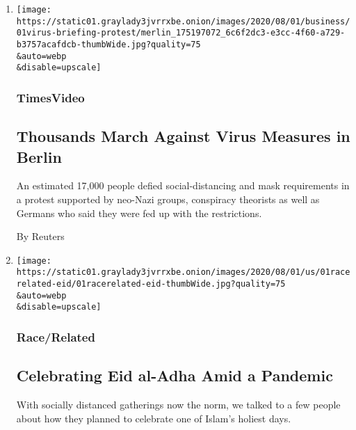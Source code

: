 \begin{enumerate}
\def\labelenumi{\arabic{enumi}.}
\item
  \href{/video/world/europe/100000007268465/coronavirus-protest-germany.html}{}

  \texttt{[image: https://static01.graylady3jvrrxbe.onion/images/2020/08/01/business/01virus-briefing-protest/merlin\_175197072\_6c6f2dc3-e3cc-4f60-a729-b3757acafdcb-thumbWide.jpg?quality=75\\\&auto=webp\\\&disable=upscale]}

  \hypertarget{timesvideo}{%
  \subsubsection{TimesVideo}\label{timesvideo}}

  \hypertarget{thousands-march-against-virus-measures-in-berlin}{%
  \subsection{Thousands March Against Virus Measures in
  Berlin}\label{thousands-march-against-virus-measures-in-berlin}}

  An estimated 17,000 people defied social-distancing and mask
  requirements in a protest supported by neo-Nazi groups, conspiracy
  theorists as well as Germans who said they were fed up with the
  restrictions.

  By Reuters
\item
  \href{/2020/08/01/us/eid-al-adha-coronavirus.html}{}

  \texttt{[image: https://static01.graylady3jvrrxbe.onion/images/2020/08/01/us/01racerelated-eid/01racerelated-eid-thumbWide.jpg?quality=75\\\&auto=webp\\\&disable=upscale]}

  \hypertarget{racerelated}{%
  \subsubsection{Race/Related}\label{racerelated}}

  \hypertarget{celebrating-eid-al-adha-amid-a-pandemic}{%
  \subsection{Celebrating Eid al-Adha Amid a
  Pandemic}\label{celebrating-eid-al-adha-amid-a-pandemic}}

  With socially distanced gatherings now the norm, we talked to a few
  people about how they planned to celebrate one of Islam's holiest
  days.


\end{enumerate}

